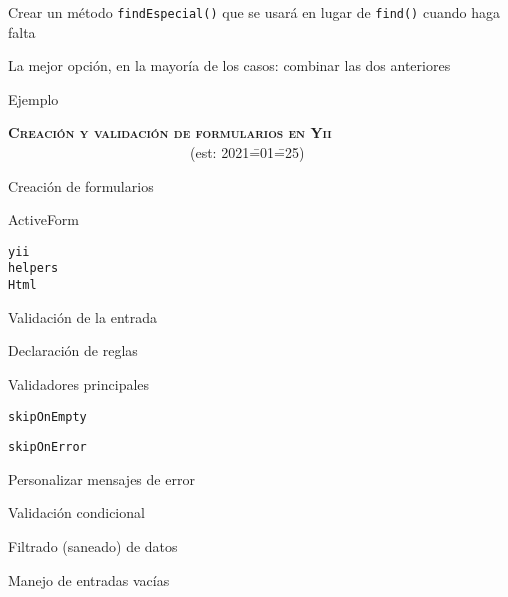 \begin{longenum}
\begin{longenum}
\begin{longenum}
\begin{longenum}
\begin{longenum}
                    \item Crear un método \texttt{findEspecial()} que se usará en lugar de \texttt{find()} cuando haga falta
                    \item La mejor opción, en la mayoría de los casos: combinar las dos anteriores
                    \begin{longenum}
                        \item Ejemplo
                    \end{longenum}
                \end{longenum}
            \end{longenum}
        \end{longenum}
    \end{longenum}
    \item \textbf{\textsc{Creación y validación de formularios en Yii}} \ \ \ \ \ \ \ \ \ \ \ \ \ \ \ \ \ \ \ \ \ \ \ \ \ \ (est: 2021\==01\==25)
    \begin{longenum}
        \item Creación de formularios
        \begin{longenum}
            \item ActiveForm
            \item \texttt{yii\\helpers\\Html}
        \end{longenum}
        \item Validación de la entrada
        \begin{longenum}
            \item Declaración de reglas
            \begin{longenum}
                \item Validadores principales
                \item \texttt{skipOnEmpty}
                \item \texttt{skipOnError}
                \item Personalizar mensajes de error
                \item Validación condicional
                \item Filtrado (saneado) de datos
                \item Manejo de entradas vacías
            \end{longenum}

\end{longenum}
\end{longenum}
\end{longenum}
